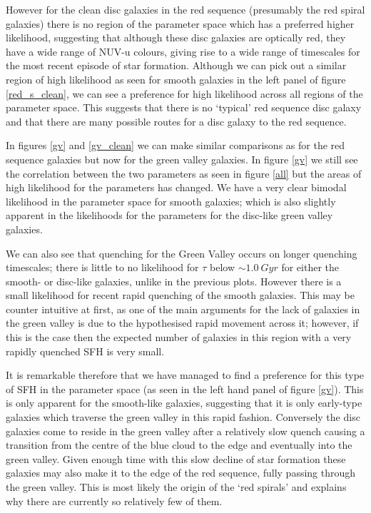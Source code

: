 \documentclass{mn2e}
\begin{document}
However for the clean disc  galaxies in the red sequence (presumably the red spiral galaxies) there is no region of the parameter space which has a preferred higher likelihood, suggesting that although these disc galaxies are optically red, they have a wide range of NUV-u colours, giving rise to a wide range of timescales for the most recent episode of star formation. Although we can pick out a similar region of high likelihood as seen for smooth galaxies in the left panel of figure \ref{red_s_clean}, we can see a preference for high likelihood across all regions of the parameter space. This suggests that there is no `typical' red sequence disc galaxy and that there are many possible routes for a disc galaxy to the red sequence. 

In figures \ref{gv} and \ref{gv_clean} we can make similar comparisons as for the red sequence galaxies but now for the green valley galaxies. In figure \ref{gv} we still see the correlation between the two parameters as seen in figure \ref{all} but the areas of high likelihood for the parameters has changed. We have a very clear bimodal likelihood in the parameter space for smooth galaxies; which is also slightly apparent in the likelihoods for the parameters for the disc-like green valley galaxies. 

We can also see that quenching for the Green Valley occurs on longer quenching timescales; there is little to no likelihood for $\tau$ below $\sim 1.0 ~Gyr$ for either the smooth- or disc-like galaxies, unlike in the previous plots. However there is a small likelihood for recent rapid quenching of the smooth galaxies. This may be counter intuitive at first, as one of the main arguments for the lack of galaxies in the green valley is due to the hypothesised rapid movement across it; however, if this is the case then the expected number of galaxies in this region with a very rapidly quenched SFH is very small. 

It is remarkable therefore that we have managed to find a preference for this type of SFH in the parameter space (as seen in the left hand panel of figure \ref{gv}). This is only apparent for the smooth-like galaxies, suggesting that it is only early-type galaxies which traverse the green valley in this rapid fashion. Conversely the disc galaxies come to reside in the green valley after a relatively slow quench causing a transition from the centre of the blue cloud to the edge and eventually into the green valley. Given enough time with this slow decline of star formation these galaxies may also make it to the edge of the red sequence, fully passing through the green valley. This is most likely the origin of the `red spirals' and explains why there are currently so relatively few of them.
\end{document}
